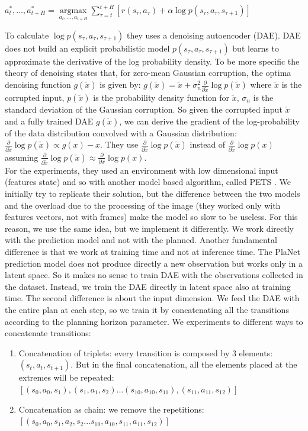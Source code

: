 $a_{t}^{*}, \ldots, a_{t+H}^{*}=\underset{a_{t}, \ldots, a_{t+H}}{\operatorname{argmax}} \sum_{\tau=t}^{t+H}\left[r\left(s_{\tau}, a_{\tau}\right)+\alpha \log p\left(s_{\tau}, a_{\tau}, s_{\tau+1}\right)\right]$

To calculate $\log p\left(s_{\tau}, a_{\tau}, s_{\tau+1}\right)$ they uses a denoising autoencoder (DAE).
DAE does not build an explicit probabilistic model $p\left(s_{\tau}, a_{\tau}, s_{\tau+1}\right)$ but learns to approximate the derivative of the log probability density.
To be more specific the theory of denoising states that, for zero-mean Gaussian corruption, the optima denoising function $g(\tilde{x})$ is given by:
$g(\tilde{x})=\tilde{x}+\sigma_{n}^{2} \frac{\partial}{\partial \tilde{x}} \log p(\tilde{x})$
where $\tilde{x}$  is the corrupted input, $p(\tilde{x})$ is the probability density function for $\tilde{x}$, $\sigma_n$ is the standard deviation of the Gaussian corruption.
So given the corrupted input $\tilde{x}$ and a fully trained DAE $g(\tilde{x})$, we can derive the gradient of the log-probability of the data distribution convolved with a Gaussian distribution:
$\frac{\partial}{\partial \tilde{x}} \log p(\tilde{x}) \propto g(x)-x$. 
They use $\frac{\partial}{\partial \tilde{x}} \log p(\tilde{x}) $ instead of $\frac{\partial}{\partial \tilde{x}} \log p(x) $ assuming $\frac{\partial}{\partial \tilde{x}} \log p(\tilde{x}) \approx \frac{\partial}{\partial x} \log p(x)$.
\\
For the experiments, they used an environment with low dimensional input (features state) and so with another model based algorithm, called PETS \cite{chua2018deep}. 
We initially try to replicate their solution, but the difference between the two models and the overload due to the processing of the image (they worked only with features vectors, not with frames) make the model so slow to be useless. 
For this reason, we use the same idea, but we implement it differently. We work directly with the prediction model and not with the planned.  Another fundamental difference is that we work at training time and not at inference time.
The PlaNet prediction model does not produce directly a new observation but works only in a latent space. So it makes no sense to train DAE with the observations collected in the dataset. Instead, we train the DAE directly in latent space also at training time.
The second difference is about the input dimension.
We feed the DAE with the entire plan at each step, so we train it by concatenating all the transitions according to the planning horizon parameter.
We experiments to different ways to concatenate transitions:
\begin{enumerate}
\item Concatenation of triplets: every transition is composed by 3 elements: $(s_t,a_t,s_{t+1})$. But in the final concatenation, all the elements placed at the extremes will be repeated: $[ (s_0,a_0,s_1) , (s_1,a_1,s_2) ... (s_{10},a_{10},s_{11}),  (s_{11},a_{11},s_{12}) ]$
\item Concatenation as chain: we remove the repetitions: $[ (s_0,a_0,s_1,a_2,s_2 ... s_{10},a_{10},s_{11},a_{11},s_{12}) ]$
\end{enumerate}

